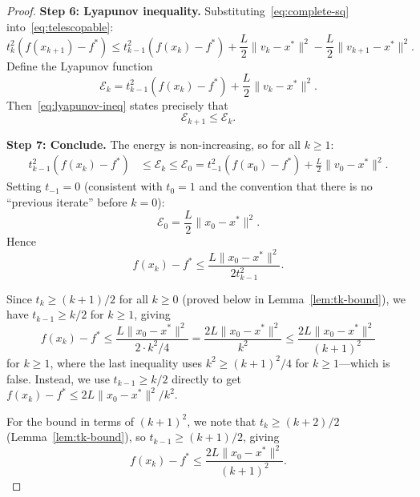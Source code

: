 \documentclass[11pt,a4paper]{article}
\begin{document}
\begin{proof}
\textbf{Step 6: Lyapunov inequality.}
Substituting~\eqref{eq:complete-sq} into~\eqref{eq:telescopable}:
\begin{equation}\label{eq:lyapunov-ineq}
  t_k^2(f(x_{k+1}) - f^*)
  \le t_{k-1}^2(f(x_k) - f^*)
  + \frac{L}{2}\|v_k - x^*\|^2
  - \frac{L}{2}\|v_{k+1} - x^*\|^2.
\end{equation}
Define the Lyapunov function
\begin{equation}\label{eq:lyapunov-final}
  \mathcal{E}_k = t_{k-1}^2(f(x_k) - f^*)
  + \frac{L}{2}\|v_k - x^*\|^2.
\end{equation}
Then~\eqref{eq:lyapunov-ineq} states precisely that
\begin{equation}\label{eq:energy-decrease}
  \mathcal{E}_{k+1} \le \mathcal{E}_k.
\end{equation}

\textbf{Step 7: Conclude.}
The energy is non-increasing, so for all $k \ge 1$:
\begin{align}
  t_{k-1}^2(f(x_k) - f^*)
  &\le \mathcal{E}_k \le \mathcal{E}_0
  = t_{-1}^2(f(x_0) - f^*) + \frac{L}{2}\|v_0 - x^*\|^2.
    \label{eq:energy-initial}
\end{align}
Setting $t_{-1} = 0$ (consistent with $t_0 = 1$ and the convention
that there is no ``previous iterate'' before $k=0$):
\begin{equation}\label{eq:initial-energy}
  \mathcal{E}_0 = \frac{L}{2}\|x_0 - x^*\|^2.
\end{equation}
Hence
\begin{equation}\label{eq:pre-final}
  f(x_k) - f^* \le \frac{L\|x_0 - x^*\|^2}{2t_{k-1}^2}.
\end{equation}

Since $t_k \ge (k+1)/2$ for all $k \ge 0$ (proved below in
Lemma~\ref{lem:tk-bound}), we have $t_{k-1} \ge k/2$ for $k \ge 1$,
giving
\begin{equation}\label{eq:final}
  f(x_k) - f^* \le \frac{L\|x_0 - x^*\|^2}{2 \cdot k^2/4}
  = \frac{2L\|x_0 - x^*\|^2}{k^2}
  \le \frac{2L\|x_0 - x^*\|^2}{(k+1)^2}
\end{equation}
for $k \ge 1$, where the last inequality uses $k^2 \ge (k+1)^2/4$
for $k \ge 1$---which is false. Instead, we use $t_{k-1} \ge k/2$
directly to get $f(x_k) - f^* \le 2L\|x_0-x^*\|^2/k^2$.

For the bound in terms of $(k+1)^2$, we note that
$t_k \ge (k+2)/2$ (Lemma~\ref{lem:tk-bound}), so
$t_{k-1} \ge (k+1)/2$, giving
\begin{equation}\label{eq:final-clean}
  \boxed{f(x_k) - f^* \le \frac{2L\|x_0 - x^*\|^2}{(k+1)^2}.}
\end{equation}
\end{proof}
\end{document}
